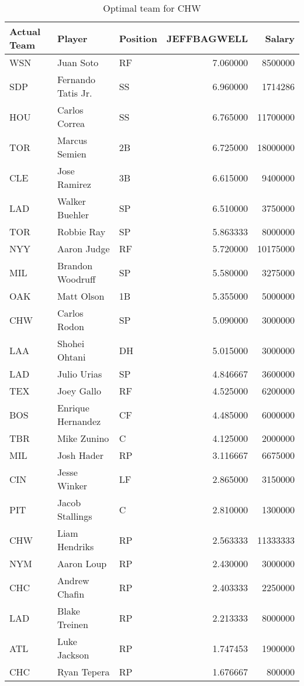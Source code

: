 \begin{table}

\caption{Optimal team for CHW}
\centering
\begin{tabular}[t]{l|l|l|r|r}
\hline
Actual Team & Player & Position & JEFFBAGWELL & Salary\\
\hline
WSN & Juan Soto & RF & 7.060000 & 8500000\\
\hline
SDP & Fernando Tatis Jr. & SS & 6.960000 & 1714286\\
\hline
HOU & Carlos Correa & SS & 6.765000 & 11700000\\
\hline
TOR & Marcus Semien & 2B & 6.725000 & 18000000\\
\hline
CLE & Jose Ramirez & 3B & 6.615000 & 9400000\\
\hline
LAD & Walker Buehler & SP & 6.510000 & 3750000\\
\hline
TOR & Robbie Ray & SP & 5.863333 & 8000000\\
\hline
NYY & Aaron Judge & RF & 5.720000 & 10175000\\
\hline
MIL & Brandon Woodruff & SP & 5.580000 & 3275000\\
\hline
OAK & Matt Olson & 1B & 5.355000 & 5000000\\
\hline
CHW & Carlos Rodon & SP & 5.090000 & 3000000\\
\hline
LAA & Shohei Ohtani & DH & 5.015000 & 3000000\\
\hline
LAD & Julio Urias & SP & 4.846667 & 3600000\\
\hline
TEX & Joey Gallo & RF & 4.525000 & 6200000\\
\hline
BOS & Enrique Hernandez & CF & 4.485000 & 6000000\\
\hline
TBR & Mike Zunino & C & 4.125000 & 2000000\\
\hline
MIL & Josh Hader & RP & 3.116667 & 6675000\\
\hline
CIN & Jesse Winker & LF & 2.865000 & 3150000\\
\hline
PIT & Jacob Stallings & C & 2.810000 & 1300000\\
\hline
CHW & Liam Hendriks & RP & 2.563333 & 11333333\\
\hline
NYM & Aaron Loup & RP & 2.430000 & 3000000\\
\hline
CHC & Andrew Chafin & RP & 2.403333 & 2250000\\
\hline
LAD & Blake Treinen & RP & 2.213333 & 8000000\\
\hline
ATL & Luke Jackson & RP & 1.747453 & 1900000\\
\hline
CHC & Ryan Tepera & RP & 1.676667 & 800000\\
\hline
\end{tabular}
\end{table}
